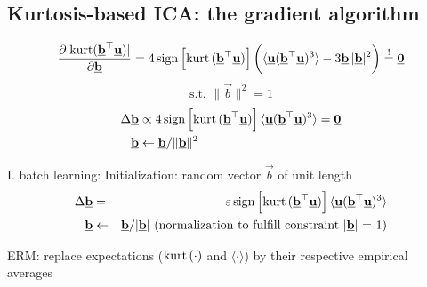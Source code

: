 \subsection{Kurtosis-based ICA: the gradient algorithm}

\begin{frame}


\begin{equation}
\label{eq:kurtgradient}
	\frac{\partial |\text{kurt}(\underline{\mathbf{b}}^\top \underline{\mathbf{u}})|}{\partial \underline{\mathbf{b}}} 
    =  4 \operatorname{sign} \left[ \operatorname{kurt}{(\underline{\mathbf{b}}^\top \underline{\mathbf{u}})} \right] \bigg( \langle \underline{\mathbf{u}} (\underline{\mathbf{b}}^\top \underline{\mathbf{u}})^3 \rangle - 3 \underline{\mathbf{b}} \, | \underline{\mathbf{b}} |^2 \bigg) \stackrel{\mathrm{!}}{=} \underline{\mathbf{0}}
\end{equation}
\begin{equation}
\label{eq:kurtgradientconstraint}
    \text{s.t. } \lVert{\vec{b}}\rVert^2 = 1
\end{equation}
\normalsize
\begin{align}
\label{eq:kurtgradientsimple}
	\Delta \underline{\mathbf{b}} &\propto 4 \operatorname{sign} \left[ \operatorname{kurt}{(\underline{\mathbf{b}}^\top \underline{\mathbf{u}})} \right] \langle \underline{\mathbf{u}} (\underline{\mathbf{b}}^\top \underline{\mathbf{u}})^3 \rangle = \underline{\mathbf{0}}\\
    \underline{\mathbf{b}} &\leftarrow \underline{\mathbf{b}} / \lVert{\ensuremath{\underline{\mathbf{b}}}}\rVert^2
\end{align}


\end{frame}

\begin{frame}
\begin{block}{I. batch learning:}
	Initialization: random vector $\vec{b}$ of unit length
	\begin{eqnarray*}
	\Delta \underline{\mathbf{b}} &=& \varepsilon \operatorname{sign}\left[ \operatorname{kurt}{(\underline{\mathbf{b}}^\top \underline{\mathbf{u}})} \right] \langle \underline{\mathbf{u}} (\underline{\mathbf{b}}^\top \underline{\mathbf{u}})^3 \rangle \\
	\underline{\mathbf{b}} &\leftarrow& \underline{\mathbf{b}} / |\underline{\mathbf{b}}| \text{ (normalization to fulfill constraint |\ensuremath{\underline{\mathbf{b}}}| = 1)}  
	\end{eqnarray*}
	
	\small
	ERM: replace expectations ($\operatorname{kurt}{(\cdot)}$ and $\langle \cdot \rangle$) by their respective empirical averages
	\normalsize
\end{block}
\end{frame}


